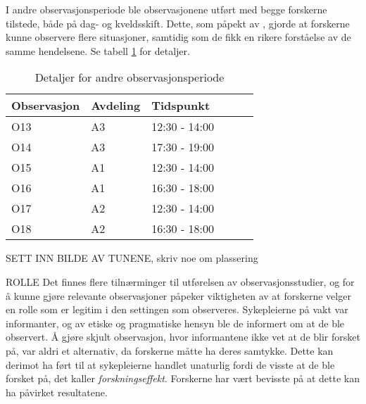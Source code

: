 \noindent
I andre observasjonsperiode ble observasjonene utført med begge forskerne tilstede, både på dag- og kveldsskift. Dette, som påpekt av \citet{Millen00}, gjorde at forskerne kunne observere flere situasjoner, samtidig som de fikk en rikere forståelse av de samme hendelsene. Se tabell \ref{detaljer2} for detaljer.
 
\begin{table}[H]\centering
    \begin{tabular}{ |l|l|l|l|l|l| }
    \hline
    Observasjon & Avdeling & Tidspunkt \\ \hline
       O13 & A3 & 12:30 - 14:00 \\ \hline
       O14 & A3 & 17:30 - 19:00 \\ \hline
      O15 & A1 & 12:30 - 14:00 \\ \hline
       O16 & A1 & 16:30 - 18:00 \\ \hline
         O17 & A2 & 12:30 - 14:00 \\ \hline
       O18 & A2 & 16:30 - 18:00 \\ \hline
    \end{tabular}
    \caption {Detaljer for andre observasjonsperiode}
    \label{detaljer2}
\end{table}
 
\noindent
SETT INN BILDE AV TUNENE, skriv noe om plassering
 
 
\noindent
ROLLE
Det finnes flere tilnærminger til utførelsen av observasjonsstudier, og for å kunne gjøre relevante observasjoner påpeker \citet{Tjora} viktigheten av at forskerne velger en rolle som er legitim i den settingen som observeres. Sykepleierne på vakt var informanter, og av etiske og pragmatiske hensyn ble de informert om at de ble observert. Å gjøre skjult observasjon, hvor informantene ikke vet at de blir forsket på, var aldri et alternativ, da forskerne måtte ha deres samtykke. Dette kan derimot ha ført til at sykepleierne handlet unaturlig fordi de visste at de ble forsket på, det \citet{Tjora} kaller \textit{forskningseffekt}. Forskerne har vært bevisste på at dette kan ha påvirket resultatene.
 
